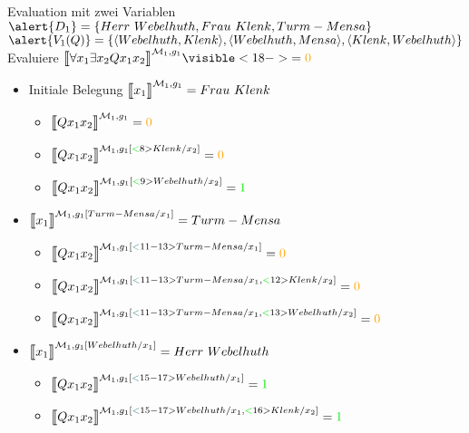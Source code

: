 \else
  \begin{frame}
    {Evaluation mit zwei Variablen}
    \onslide<+->
    \onslide<+->\scriptsize
    $\alert{D_1}=\{Herr\ Webelhuth, Frau\ Klenk, Turm-Mensa\}$ \\
    \onslide<+->
    $\alert{V_1(Q)}=\{\tuple{Webelhuth,Klenk},\tuple{Webelhuth,Mensa},\tuple{Klenk,Webelhuth}\}$ \\
    \onslide<+->
    Evaluiere \alert{$\dem{\forall x_1\exists x_2 Qx_1x_2}^{\Model_1,g_1}\visible<18->{=\orongsch{0}}$} \\
    \onslide<+->
    \Zeile
    \begin{minipage}{0.5\textwidth}\begin{itemize}[<+->]
          \item Initiale Belegung $\dem{x_1}^{\Model_1,g_1}=Frau\ Klenk$
            \begin{itemize}[<+->]\scriptsize
              \item $\dem{Qx_1x_2}^{\mMm_1,g_1}=\orongsch{0}$
              \item $\dem{Qx_1x_2}^{\mMm_1,g_1[\gruen<8>{Klenk/x_2}]}=\orongsch{0}$
              \item $\dem{Qx_1x_2}^{\mMm_1,g_1[\gruen<9>{Webelhuth/x_2}]}=\gruen{1}$
            \end{itemize}
          \item $\dem{x_1}^{\Model_1,g_1[Turm-Mensa/x_1]}=Turm-Mensa$
            \begin{itemize}[<+->]\scriptsize
              \item $\dem{Qx_1x_2}^{\mMm_1,g_1[\tuerkis<11-13>{Turm-Mensa/x_1}]}=\orongsch{0}$
              \item $\dem{Qx_1x_2}^{\mMm_1,g_1[\tuerkis<11-13>{Turm-Mensa/x_1},\gruen<12>{Klenk/x_2}]}=\orongsch{0}$
              \item $\dem{Qx_1x_2}^{\mMm_1,g_1[\tuerkis<11-13>{Turm-Mensa/x_1},\gruen<13>{Webelhuth/x_2}]}=\orongsch{0}$ 
            \end{itemize}
          \item $\dem{x_1}^{\Model_1,g_1[Webelhuth/x_1]}=Herr\ Webelhuth$
            \begin{itemize}[<+->]\scriptsize
              \item $\dem{Qx_1x_2}^{\mMm_1,g_1[\tuerkis<15-17>{Webelhuth/x_1}]}=\gruen{1}$
              \item $\dem{Qx_1x_2}^{\mMm_1,g_1[\tuerkis<15-17>{Webelhuth/x_1},\gruen<16>{Klenk/x_2}]}=\gruen{1}$

\end{itemize}
\end{itemize}
\end{minipage}
\end{frame}

